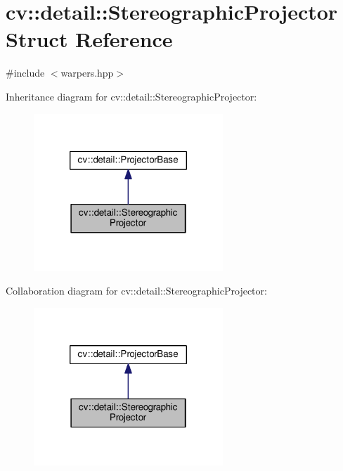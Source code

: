 \hypertarget{structcv_1_1detail_1_1StereographicProjector}{\section{cv\-:\-:detail\-:\-:Stereographic\-Projector Struct Reference}
\label{structcv_1_1detail_1_1StereographicProjector}
}


{\ttfamily \#include $<$warpers.\-hpp$>$}



Inheritance diagram for cv\-:\-:detail\-:\-:Stereographic\-Projector\-:\nopagebreak
\begin{figure}[H]
\begin{center}
\leavevmode
\includegraphics[width=202pt]{structcv_1_1detail_1_1StereographicProjector__inherit__graph}
\end{center}
\end{figure}


Collaboration diagram for cv\-:\-:detail\-:\-:Stereographic\-Projector\-:\nopagebreak
\begin{figure}[H]
\begin{center}
\leavevmode
\includegraphics[width=202pt]{structcv_1_1detail_1_1StereographicProjector__coll__graph}
\end{center}
\end{figure}
